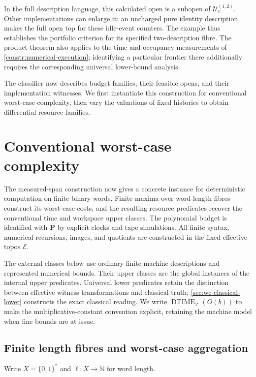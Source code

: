\documentclass[11pt,a4paper]{article}
\numberwithin{algorithm}{section}
\numberwithin{equation}{section}
\theoremstyle{definition}
\theoremstyle{remark}
\theoremstyle{plain}
\newcommand{\E}{\mathcal E}
\newcommand{\N}{\mathbb N}
\newcommand{\BinWords}{\{0,1\}^{*}}
\newcommand{\DTIME}{\operatorname{DTIME}}
\theoremstyle{definition}
\theoremstyle{plain}
\begin{document}
In the full description language, this calculated open is a subopen
of $\mathcal U_v^{(1,2)}$. Other implementations can enlarge it:
an uncharged pure identity description makes the full open top for
these idle-event counters. The example thus establishes the
portfolio criterion for its specified two-description fibre.
The product theorem also applies to the time and occupancy
measurements of \cref{constr:numerical-execution}; identifying a
particular frontier there additionally requires the corresponding
universal lower-bound analysis.

\label{app:complexity-probe-scope}
The classifier now describes budget families, their feasible opens,
and their implementation witnesses. We first instantiate this
construction for conventional worst-case complexity, then vary
the valuations of fixed histories to obtain differential resource
families.


\section{Conventional worst-case complexity}
\label{sec:worst-case}

The measured-span construction now gives a concrete instance for
deterministic computation on finite binary words. Finite maxima over
word-length fibres construct its worst-case costs, and the resulting
resource predicates recover the conventional time and workspace upper
classes. The polynomial budget is identified with $\mathbf P$ by
explicit clocks and tape simulations. All finite syntax, numerical
recursions, images, and quotients are constructed in the fixed
effective topos $\E$.

The external classes below use ordinary finite machine descriptions
and represented numerical bounds. Their upper classes are the global
instances of the internal upper predicates. Universal lower predicates
retain the distinction between effective witness transformations and
classical truth; \cref{sec:wc-classical-lower} constructs the exact
classical reading. We write $\DTIME_{\mathcal T}(O(b))$ to make
the multiplicative-constant convention explicit, retaining the
machine model when fine bounds are at issue.


\subsection{Finite length fibres and worst-case aggregation}

Write $X=\BinWords$ and $\ell:X\to\N$ for word length.
\end{document}
